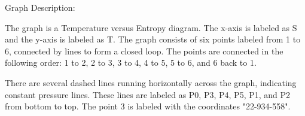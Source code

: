 Graph Description:

The graph is a Temperature versus Entropy diagram. The x-axis is labeled as S and the y-axis is labeled as T. The graph consists of six points labeled from 1 to 6, connected by lines to form a closed loop. The points are connected in the following order: 1 to 2, 2 to 3, 3 to 4, 4 to 5, 5 to 6, and 6 back to 1.

There are several dashed lines running horizontally across the graph, indicating constant pressure lines. These lines are labeled as P0, P3, P4, P5, P1, and P2 from bottom to top. The point 3 is labeled with the coordinates "22-934-558".